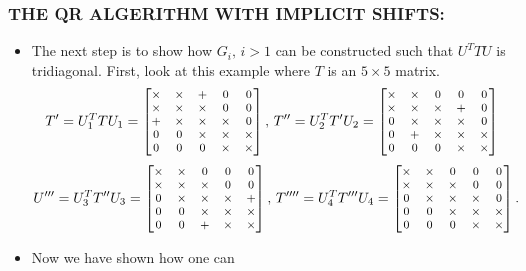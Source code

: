 \documentclass[a4paper,8pt]{beamer} %
\newcommand{\smatrix}[1]{\left[\begin{matrix} #1 \end{matrix}\right]}
\begin{document}
\begin{frame}  %
\frametitle{THE QR ALGERITHM WITH IMPLICIT SHIFTS:}
\begin{itemize}
	\item
	The next step is to show how $G_i,\,i>1$ can be constructed such that $U^TTU$ is tridiagonal.
	First, look at this example where $T$ is an $5\times 5$ matrix.
	\begin{equation}
		\begin{footnotesize}
		T'=U_1 ^T T U_1= 
		\smatrix
		{
			\times 	& \times & + & 0 & 0   \\
			\times 	& \times & \times & 0 & 0   \\
			+   	& \times & \times & \times & 0   \\
			0 & 0 & \times & \times & \times     \\
			0 & 0 & 0 & \times & \times    \\
		}
		,\,
		T''=U_2^T T' U_2 = 
		\smatrix
		{
			\times 	& \times & 0 & 0 & 0   \\
			\times 	& \times & \times & + & 0   \\
			0 	& \times & \times & \times & 0    \\
			0 & + & \times & \times & \times   \\
			0 & 0 & 0 & \times & \times  \\
		}
		\end{footnotesize}
	\end{equation}
	\begin{equation}
		\begin{footnotesize}
		U'''=U_3^T T'' U_3 = 
		\smatrix
		{
			\times 	& \times & 0 & 0 & 0   \\
			\times 	& \times & \times & 0 & 0   \\
			0 	& \times & \times & \times & +\\
			0 & 0 & \times & \times & \times   \\
			0 & 0 & + & \times & \times  \\
		}
		,\,
		T''''=U_4^{T}T'''U_4= 
		\smatrix
		{
			\times 	& \times & 0 & 0 & 0   \\
			\times 	& \times & \times & 0 & 0   \\
			0 	& \times & \times & \times & 0    \\
			0 & 0 & \times & \times & \times   \\
			0 & 0 & 0 & \times & \times  \\
		}
		.
		\end{footnotesize}
	\end{equation}
\item Now we have shown how one can 
\end{itemize}
\end{frame}%
\end{document}
